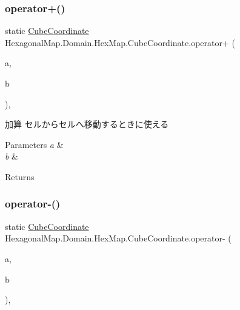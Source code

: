 \subsubsection{\texorpdfstring{operator+()}{operator+()}}
{\footnotesize\ttfamily static \mbox{\hyperlink{struct_hexagonal_map_1_1_domain_1_1_hex_map_1_1_cube_coordinate}{Cube\+Coordinate}} Hexagonal\+Map.\+Domain.\+Hex\+Map.\+Cube\+Coordinate.\+operator+ (\begin{DoxyParamCaption}\item[{\mbox{\hyperlink{struct_hexagonal_map_1_1_domain_1_1_hex_map_1_1_cube_coordinate}{Cube\+Coordinate}}}]{a,  }\item[{\mbox{\hyperlink{struct_hexagonal_map_1_1_domain_1_1_hex_map_1_1_cube_coordinate}{Cube\+Coordinate}}}]{b }\end{DoxyParamCaption})\hspace{0.3cm}{\ttfamily [inline]}, {\ttfamily [static]}}



加算 セルからセルへ移動するときに使える 


\begin{DoxyParams}{Parameters}
{\em a} & \\
\hline
{\em b} & \\
\hline
\end{DoxyParams}
\begin{DoxyReturn}{Returns}

\end{DoxyReturn}
\mbox{\label{struct_hexagonal_map_1_1_domain_1_1_hex_map_1_1_cube_coordinate_ab94a6ae2126ec743ac77ba162df68966}} 
\subsubsection{\texorpdfstring{operator-\/()}{operator-()}}
{\footnotesize\ttfamily static \mbox{\hyperlink{struct_hexagonal_map_1_1_domain_1_1_hex_map_1_1_cube_coordinate}{Cube\+Coordinate}} Hexagonal\+Map.\+Domain.\+Hex\+Map.\+Cube\+Coordinate.\+operator-\/ (\begin{DoxyParamCaption}\item[{\mbox{\hyperlink{struct_hexagonal_map_1_1_domain_1_1_hex_map_1_1_cube_coordinate}{Cube\+Coordinate}}}]{a,  }\item[{\mbox{\hyperlink{struct_hexagonal_map_1_1_domain_1_1_hex_map_1_1_cube_coordinate}{Cube\+Coordinate}}}]{b }\end{DoxyParamCaption})\hspace{0.3cm}{\ttfamily [inline]}, {\ttfamily [static]}}



